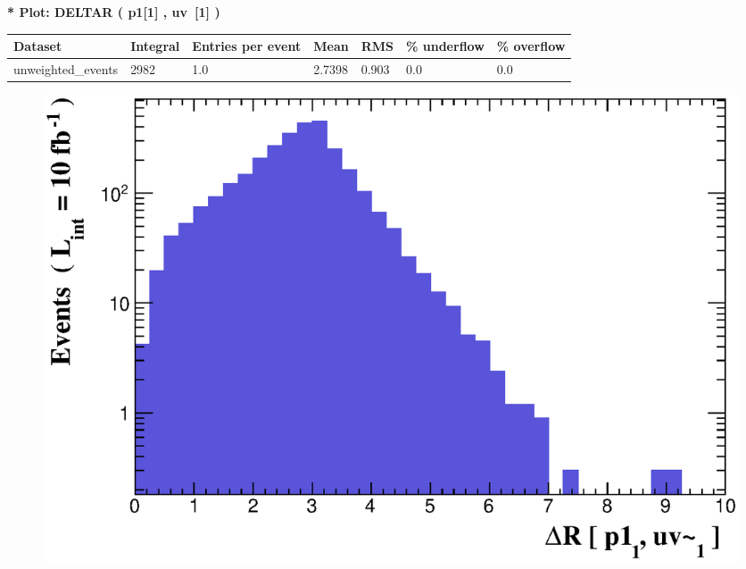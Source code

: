 \documentclass[a4paper, 10pt]{article}
\begin{document}
\textbf{* Plot: DELTAR ( p1[1] , uv~[1] ) }\\
   \begin{table}[H]
  \begin{center}
    \begin{tabular}{|m{23.0mm}|m{23.0mm}|m{18.0mm}|m{19.0mm}|m{19.0mm}|m{19.0mm}|m{19.0mm}|}
      \hline
      {\cellcolor{yellow}         Dataset}& {\cellcolor{yellow}         Integral}& {\cellcolor{yellow}         Entries per event}& {\cellcolor{yellow}         Mean}& {\cellcolor{yellow}         RMS}& {\cellcolor{yellow}         \% underflow}& {\cellcolor{yellow}         \% overflow}\\
      \hline
      {\cellcolor{white}         unweighted\_events}& {\cellcolor{white}         2982}& {\cellcolor{white}         1.0}& {\cellcolor{white}         2.7398}& {\cellcolor{white}         0.903}& {\cellcolor{green}         0.0}& {\cellcolor{green}         0.0}\\
\hline
    \end{tabular}
  \end{center}
\end{table}

\begin{figure}[H]
  \begin{center}
    \includegraphics[scale=0.45]{selection_21.eps}\\
\caption{   }
  \end{center}
\end{figure}
      
\end{document}
